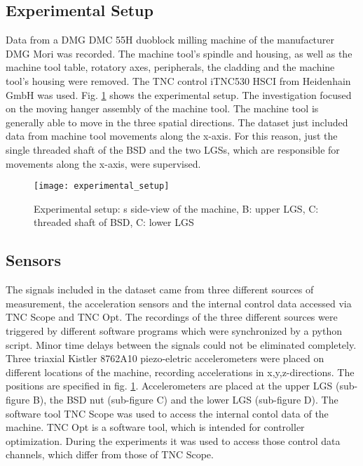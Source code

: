 \subsection{Experimental Setup}
Data from a DMG DMC 55H duoblock milling machine of the manufacturer DMG Mori was recorded. The machine tool’s spindle and housing, as well as the machine tool table, rotatory axes, peripherals, the cladding and the machine tool's housing were removed. The TNC control iTNC530 HSCI from Heidenhain GmbH was used. Fig. \ref{fig:experimental_setup} shows the experimental setup. The investigation focused on the moving hanger assembly of the machine tool. The machine tool is generally able to move in the three spatial directions. The dataset just included data from machine tool movements along the x-axis. For this reason, just the single threaded shaft of the BSD and the two LGSs, which are responsible for movements along the x-axis, were supervised.

\begin{figure}[H]
  \centering
  \texttt{[image: experimental\_setup]}
  \caption {Experimental setup: s side-view of the machine, B: upper LGS, C: threaded shaft of BSD, C: lower LGS}
  \label{fig:experimental_setup}
\end{figure}

\subsection{Sensors}
The signals included in the dataset came from three different sources of measurement, the acceleration sensors and the internal control data accessed via TNC Scope and TNC Opt. The recordings of the three different sources were triggered by different software programs which were synchronized by a python script. Minor time delays between the signals could not be eliminated completely. Three triaxial Kistler 8762A10 piezo-eletric accelerometers were placed on different locations of the machine, recording accelerations in x,y,z-directions. The positions are specified in fig. \ref{fig:experimental_setup}. Accelerometers are placed at the upper LGS (sub-figure B), the BSD nut (sub-figure C) and the lower LGS (sub-figure D). The software tool TNC Scope was used to access the internal contol data of the machine. TNC Opt is a software tool, which is intended for controller optimization. During the experiments it was used to access those control data channels, which differ from those of TNC Scope.

